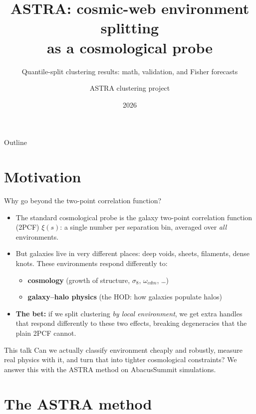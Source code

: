 \documentclass[aspectratio=169,11pt]{beamer}
\title[ASTRA cosmic-web clustering]{ASTRA: cosmic-web environment splitting\\ as a cosmological probe}
\subtitle{Quantile-split clustering results: math, validation, and Fisher forecasts}
\author{ASTRA clustering project}
\institute{}
\date{2026}
\begin{document}
\begin{frame}
\titlepage
\end{frame}

\begin{frame}{Outline}
\tableofcontents
\end{frame}

\section{Motivation}

\begin{frame}{Why go beyond the two-point correlation function?}
\begin{itemize}
\item The standard cosmological probe is the galaxy two-point correlation function
  (2PCF) $\xi(s)$: a single number per separation bin, averaged over \emph{all}
  environments.
\item But galaxies live in very different places: deep voids, sheets, filaments,
  dense knots. These environments respond differently to:
  \begin{itemize}
    \item \textbf{cosmology} (growth of structure, $\sigma_8$, $\omega_{cdm}$, \ldots)
    \item \textbf{galaxy--halo physics} (the HOD: how galaxies populate halos)
  \end{itemize}
\item \textbf{The bet:} if we split clustering \emph{by local environment}, we get
  extra handles that respond differently to these two effects, breaking
  degeneracies that the plain 2PCF cannot.
\end{itemize}
\vspace{4pt}
\begin{alertblock}{This talk}
Can we actually classify environment cheaply and robustly, measure real physics
with it, and turn that into tighter cosmological constraints? We answer this with
the ASTRA method on AbacusSummit simulations.
\end{alertblock}
\end{frame}

\section{The ASTRA method}
\end{document}
